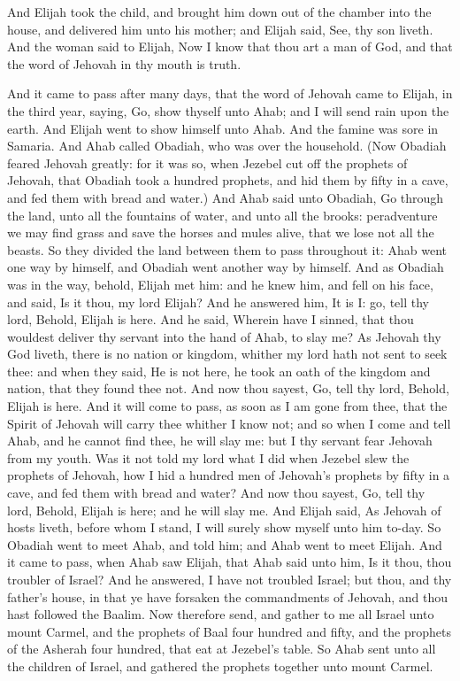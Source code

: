 And Elijah took the child, and brought him down out of the chamber into the house, and delivered him unto his mother; and Elijah said, See, thy son liveth. And the woman said to Elijah, Now I know that thou art a man of God, and that the word of Jehovah in thy mouth is truth. 

And it came to pass after many days, that the word of Jehovah came to Elijah, in the third year, saying, Go, show thyself unto Ahab; and I will send rain upon the earth. And Elijah went to show himself unto Ahab. And the famine was sore in Samaria. And Ahab called Obadiah, who was over the household. (Now Obadiah feared Jehovah greatly: for it was so, when Jezebel cut off the prophets of Jehovah, that Obadiah took a hundred prophets, and hid them by fifty in a cave, and fed them with bread and water.) And Ahab said unto Obadiah, Go through the land, unto all the fountains of water, and unto all the brooks: peradventure we may find grass and save the horses and mules alive, that we lose not all the beasts. So they divided the land between them to pass throughout it: Ahab went one way by himself, and Obadiah went another way by himself.  And as Obadiah was in the way, behold, Elijah met him: and he knew him, and fell on his face, and said, Is it thou, my lord Elijah? And he answered him, It is I: go, tell thy lord, Behold, Elijah is here. And he said, Wherein have I sinned, that thou wouldest deliver thy servant into the hand of Ahab, to slay me? As Jehovah thy God liveth, there is no nation or kingdom, whither my lord hath not sent to seek thee: and when they said, He is not here, he took an oath of the kingdom and nation, that they found thee not. And now thou sayest, Go, tell thy lord, Behold, Elijah is here. And it will come to pass, as soon as I am gone from thee, that the Spirit of Jehovah will carry thee whither I know not; and so when I come and tell Ahab, and he cannot find thee, he will slay me: but I thy servant fear Jehovah from my youth. Was it not told my lord what I did when Jezebel slew the prophets of Jehovah, how I hid a hundred men of Jehovah’s prophets by fifty in a cave, and fed them with bread and water? And now thou sayest, Go, tell thy lord, Behold, Elijah is here; and he will slay me. And Elijah said, As Jehovah of hosts liveth, before whom I stand, I will surely show myself unto him to-day.  So Obadiah went to meet Ahab, and told him; and Ahab went to meet Elijah. And it came to pass, when Ahab saw Elijah, that Ahab said unto him, Is it thou, thou troubler of Israel? And he answered, I have not troubled Israel; but thou, and thy father’s house, in that ye have forsaken the commandments of Jehovah, and thou hast followed the Baalim. Now therefore send, and gather to me all Israel unto mount Carmel, and the prophets of Baal four hundred and fifty, and the prophets of the Asherah four hundred, that eat at Jezebel’s table.  So Ahab sent unto all the children of Israel, and gathered the prophets together unto mount Carmel. 